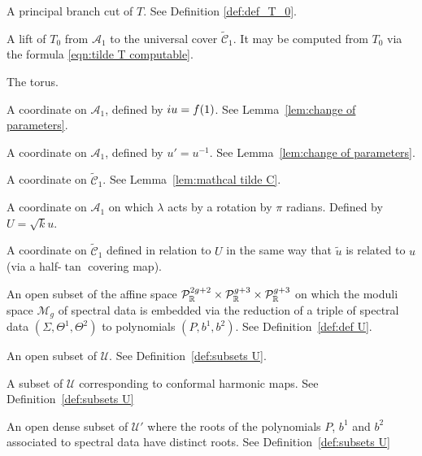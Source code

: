 \begin{description}[align=right]
\item[$T_0$] A principal branch cut of $T$. See Definition \ref{def:def_T_0}.

\item[$\tilde{T}$] A lift of $T_0$ from $\mathcal{A}_1$ to the universal cover $\mathcal{\tilde{C}}_1$. It may be computed from $T_0$ via the formula \eqref{eqn:tilde T computable}.

\item[$\mathbb{T}^2$] The torus.

\item[$u$] A coordinate on $\mathcal{A}_1$, defined by $i u = f(1)$. See Lemma~\ref{lem:change of parameters}.

\item[$u'$] A coordinate on $\mathcal{A}_1$, defined by $u' = u^{-1}$. See Lemma~\ref{lem:change of parameters}.

\item[$\tilde{u}$] A coordinate on $\mathcal{\tilde{C}}_1$. See Lemma~\ref{lem:mathcal tilde C}.

\item[$U$] A coordinate on $\mathcal{A}_1$ on which $λ$ acts by a rotation by $π$ radians. Defined by $U=\sqrt{k} u$.

\item[$\tilde{U}$] A coordinate on $\mathcal{\tilde{C}}_1$ defined in relation to $U$ in the same way that $\tilde{u}$ is related to $u$ (via a half-$\tan$ covering map).

\item[$\mathcal{U}$] An open subset of the affine space $\mathcal{P}^{2g+2}_\R\times \mathcal{P}^{g+3}_\R\times\mathcal{P}^{g+3}_\R$ on which the moduli space $\mathcal{M}_g$ of spectral data is embedded via the reduction of a triple of spectral data $(Σ,Θ^1,Θ^2)$ to polynomials $(P,b^1,b^2)$. See Definition~\ref{def:def U}.

\item[$\mathcal{U}'$] An open subset of $\mathcal{U}$. See Definition~\ref{def:subsets U}.

\item[$\mathcal{U}''$] A subset of $\mathcal{U}$ corresponding to conformal harmonic maps. See Definition~\ref{def:subsets U}

\item[$\mathcal{U}^{(i)}$] An open dense subset of $\mathcal{U}'$ where the roots of the polynomials $P$, $b^1$ and $b^2$ associated to spectral data have distinct roots. See Definition~\ref{def:subsets U}


\end{description}
